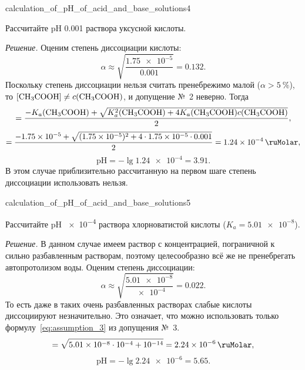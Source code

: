 \begin{example}{}{calculation_of_pH_of_acid_and_base_solutions4}
    \begin{condition}
        Рассчитайте pH \qty{0,001}{\ruMolar} раствора уксусной кислоты.
    \end{condition}

    \medskip

    \textit{Решение.} Оценим степень диссоциации кислоты:
    \begin{equation*}
        \alpha \approx \sqrt{\frac{\num{1,75e-5}}{\num{0,001}}} = \num{0,132}.
    \end{equation*}
    Поскольку степень диссоциации нельзя считать пренебрежимо малой ($\alpha > \qty{5}{\percent}$), то $[\ce{CH3COOH}] \neq  c(\ce{CH3COOH})$, и допущение №~2 неверно. Тогда
    \begin{equation*}
        [\ce{H^+}] = \frac{-K_a(\ce{CH3COOH}) + \sqrt{K_a^2(\ce{CH3COOH}) + 4K_a(\ce{CH3COOH})c(\ce{CH3COOH})}}{2},
    \end{equation*}
    \begin{equation*}
        [\ce{H^+}] = \frac{\num{-1,75e-5} + \sqrt{(\num{1,75e-5})^2 + 4 \cdot \num{1,75e-5} \cdot \num{0,001}}}{2} = \qty{1,24e-4}{\ruMolar},
    \end{equation*}
    \begin{equation*}
        \text{pH} = -\lg\num{1,24e-4} = \num{3,91}.
    \end{equation*}
    В этом случае приблизительно рассчитанную на первом шаге степень диссоциации использовать нельзя.
\end{example}

\begin{example}{}{calculation_of_pH_of_acid_and_base_solutions5}
    \begin{condition}
        Рассчитайте pH \qty{e-4}{\ruMolar} раствора хлорноватистой кислоты ($K_a = \num{5,01e-8}$).
    \end{condition}

    \medskip

    \textit{Решение.} В данном случае имеем раствор с концентрацией, пограничной к сильно разбавленным растворам, поэтому целесообразно всё же не пренебрегать автопротолизом воды. Оценим степень диссоциации:
    \begin{equation*}
        \alpha \approx \sqrt{\frac{\num{5,01e-8}}{\num{e-4}}} = \num{0,022}.
    \end{equation*}
    То есть даже в таких очень разбавленных растворах слабые кислоты диссоциируют незначительно. Это означает, что можно использовать только формулу~\eqref{eq:assumption_3} из допущения №~3.
    \begin{equation*}
        [\ce{H^+}] = \sqrt{\num{5,01e-8}\cdot\num{e-4} + \num{e-14}} = \qty{2,24e-6}{\ruMolar},
    \end{equation*}
    \begin{equation*}
        \text{pH} = -\lg\num{2,24e-6} = \num{5,65}.
    \end{equation*}
\end{example}

